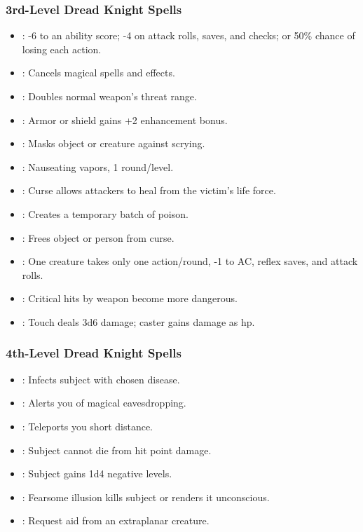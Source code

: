 \subsubsection{3rd-Level Dread Knight Spells}
\begin{itemize}
\item {}: -6 to an ability score; -4 on attack rolls, saves, and checks; or 50\% chance of losing each action.
\item {}: Cancels magical spells and effects.
\item {}: Doubles normal weapon's threat range.
\item {}: Armor or shield gains +2 enhancement bonus.
\item {}: Masks object or creature against scrying.
\item {}: Nauseating vapors, 1 round/level.
\item {}: Curse allows attackers to heal from the victim's life force.
\item {}: Creates a temporary batch of poison.
\item {}: Frees object or person from curse.
\item {}: One creature takes only one action/round, -1 to AC, reflex saves, and attack rolls.
\item {}: Critical hits by weapon become more dangerous.
\item {}: Touch deals 3d6 damage; caster gains damage as hp.
\end{itemize}
\subsubsection{4th-Level Dread Knight Spells}
\begin{itemize}
\item {}: Infects subject with chosen disease.
\item {}: Alerts you of magical eavesdropping.
\item {}: Teleports you short distance.
\item {}: Subject cannot die from hit point damage.
\item {}: Subject gains 1d4 negative levels.
\item {}: Fearsome illusion kills subject or renders it unconscious.
\item {}: Request aid from an extraplanar creature.
\end{itemize}
